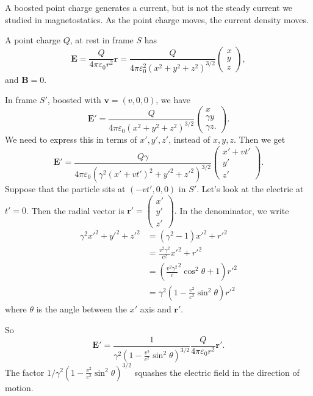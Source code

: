\documentclass[a4paper]{article}
\begin{document}
\begin{eg}
  A boosted point charge generates a current, but is not the steady current we studied in magnetostatics. As the point charge moves, the current density moves.

  A point charge $Q$, at rest in frame $S$ has
  \[
    \mathbf{E} = \frac{Q}{4\pi \varepsilon_0 r^2}\hat{\mathbf{r}} = \frac{Q}{4\pi \varepsilon_0^2(x^2 + y^2 + z^2)^{3/2}}
    \begin{pmatrix}
      x\\y\\z
    \end{pmatrix},
  \]
  and $\mathbf{B} = 0$.

  In frame $S'$, boosted with $\mathbf{v} = (v, 0, 0)$, we have
  \[
    \mathbf{E}' = \frac{Q}{4\pi \varepsilon_0(x^2 + y^2 + z^2)^{3/2}}
    \begin{pmatrix}
      x\\ \gamma y\\ \gamma z.
    \end{pmatrix}.
  \]
  We need to express this in terms of $x', y', z'$, instead of $x, y, z$. Then we get
  \[
    \mathbf{E}' = \frac{Q\gamma}{4\pi \varepsilon_0 (\gamma^2(x' + vt')^2 + y'^2 + z'^2)^{3/2}}
    \begin{pmatrix}
      x' + vt'\\y'\\z'
    \end{pmatrix}.
  \]
  Suppose that the particle sits at $(-vt', 0, 0)$ in $S'$. Let's look at the electric at $t'=0$. Then the radial vector is $\mathbf{r}' =
  \begin{pmatrix}
    x'\\y'\\z'
  \end{pmatrix}.
  $
  In the denominator, we write
  \begin{align*}
    \gamma^2x'^2 + y'^2 + z'^2 &= (\gamma^2 - 1)x'^2 + r'^2\\
    &= \frac{v^2\gamma^2}{c^2}x'^2 + r'^2\\
    &= \left(\frac{v^2\gamma^2}c^2 \cos^2 \theta + 1\right)r'^2\\
    &= \gamma^2\left(1 - \frac{v^2}{c^2}\sin^2 \theta\right)r'^2
  \end{align*}
  where $\theta$ is the angle between the $x'$ axis and $\mathbf{r}'$.

  So
  \[
    \mathbf{E}' = \frac{1}{\gamma^2\left(1 - \frac{v^2}{c^2}\sin^2 \theta\right)^{3/2}}\frac{Q}{4\pi \varepsilon_0 r^2}\hat{\mathbf{r}'}.
  \]
  The factor $1/\gamma^2\left(1 - \frac{v^2}{c^2}\sin^2 \theta\right)^{3/2}$ squashes the electric field in the direction of motion.


\end{eg}
\end{document}
